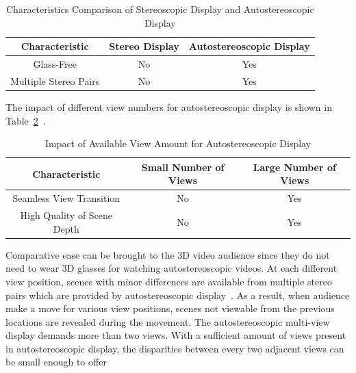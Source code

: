 \begin{table}[b]
    \caption{Characteristics Comparison of Stereoscopic Display and Autostereoscopic Display}
    \bigskip
    \label{tab:diff-stereo-autostereo}
    \centering
    \begin{tabular}{c c c}
        \hline
        Characteristic & Stereo Display & Autostereoscopic Display\\
        \hline
        Glass-Free & No & Yes \\
        Multiple Stereo Pairs & No & Yes \\
        \hline
    \end{tabular}
\end{table}
The impact of different view numbers for autostereoscopic display is shown in
Table~\ref{tab:autostereo-less-views-more-views}~\parencite{RN44}.
\begin{table}
    \caption{Impact of Available View Amount for Autostereoscopic Display}
    \bigskip
    \label{tab:autostereo-less-views-more-views}
    \centering
    \begin{tabular}{c c c}
        \hline
        Characteristic & Small Number of Views & Large Number of Views \\
        \hline
        Seamless View Transition  & No & Yes \\
        High Quality of Scene Depth & No & Yes \\
        \hline
    \end{tabular}
\end{table}
Comparative ease can be brought to the 3D video audience
since they do not need to wear 3D glasses for watching autostereoscopic videos.
At each different view position, scenes with minor differences are available
from multiple stereo pairs which are provided by autostereoscopic
display~\parencite{RN44}.
As a result, when audience make a move for various view positions, scenes
not viewable from the previous locations are revealed during the movement.
The autostereoscopic multi-view display demands more than two views.
With a sufficient amount of views present in autostereoscopic display, the
disparities between every two adjacent views can be small enough to offer
